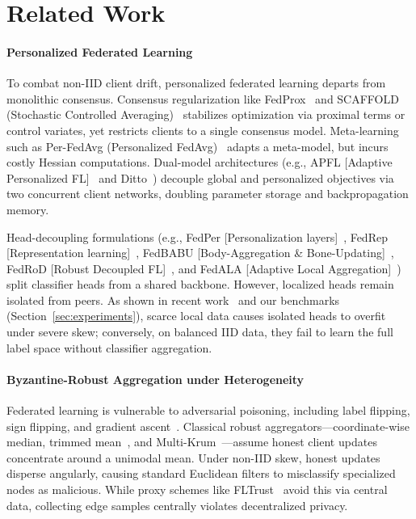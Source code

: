 \section{Related Work}
\label{sec:related}

\paragraph{Personalized Federated Learning}
To combat non-IID client drift, personalized federated learning departs from monolithic consensus. Consensus regularization like FedProx~\cite{li2020federated} and SCAFFOLD (Stochastic Controlled Averaging)~\cite{karimireddy2020scaffold} stabilizes optimization via proximal terms or control variates, yet restricts clients to a single consensus model. Meta-learning such as Per-FedAvg (Personalized FedAvg)~\cite{fallah2020personalized} adapts a meta-model, but incurs costly Hessian computations. Dual-model architectures (e.g., APFL [Adaptive Personalized FL]~\cite{deng2020adaptive} and Ditto~\cite{li2021ditto}) decouple global and personalized objectives via two concurrent client networks, doubling parameter storage and backpropagation memory.

Head-decoupling formulations (e.g., FedPer [Personalization layers]~\cite{arivazhagan2019federated}, FedRep [Representation learning]~\cite{collins2021exploiting}, FedBABU [Body-Aggregation \& Bone-Updating]~\cite{oh2021fedbabu}, FedRoD [Robust Decoupled FL]~\cite{chen2022bridging}, and FedALA [Adaptive Local Aggregation]~\cite{zhang2023fedala}) split classifier heads from a shared backbone. However, localized heads remain isolated from peers. As shown in recent work~\cite{chen2022bridging} and our benchmarks (Section~\ref{sec:experiments}), scarce local data causes isolated heads to overfit under severe skew; conversely, on balanced IID data, they fail to learn the full label space without classifier aggregation.

\paragraph{Byzantine-Robust Aggregation under Heterogeneity}
Federated learning is vulnerable to adversarial poisoning, including label flipping, sign flipping, and gradient ascent~\cite{blanchard2017machine,yin2018byzantine,fang2020local,bhagoji2019analyzing,shejwalkar2021manipulating}. Classical robust aggregators---coordinate-wise median, trimmed mean~\cite{yin2018byzantine}, and Multi-Krum~\cite{blanchard2017machine}---assume honest client updates concentrate around a unimodal mean. Under non-IID skew, honest updates disperse angularly, causing standard Euclidean filters to misclassify specialized nodes as malicious. While proxy schemes like FLTrust~\cite{cao2021fltrust} avoid this via central data, collecting edge samples centrally violates decentralized privacy.

